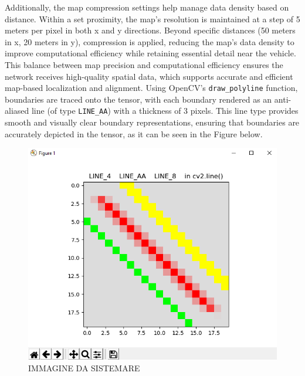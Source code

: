 \begin{itemize}
    Additionally, the map compression settings help manage data density based on distance. Within a set proximity, the map’s resolution is maintained at a step of 5 meters per pixel in both x and y directions. Beyond specific distances (50 meters in x, 20 meters in y), compression is applied, reducing the map's data density to improve computational efficiency while retaining essential detail near the vehicle.
    This balance between map precision and computational efficiency ensures the network receives high-quality spatial data, which supports accurate and efficient map-based localization and alignment.
    Using OpenCV’s \texttt{draw\_polyline} function, boundaries are traced onto the tensor, with each boundary rendered as an anti-aliased line (of type \texttt{LINE\_AA}) with a thickness of 3 pixels. This line type provides smooth and visually clear boundary representations, ensuring that boundaries are accurately depicted in the tensor, as it can be seen in the Figure below.
    \begin{figure}[H]
        \centering
        \includegraphics[width=0.5\linewidth]{LateX//figs/polyline.png}
        \caption{IMMAGINE DA SISTEMARE}
        \label{fig:enter-label}
    \end{figure}


\end{itemize}
